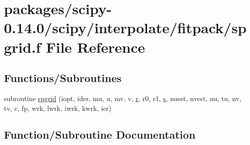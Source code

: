 \hypertarget{spgrid_8f}{}\section{packages/scipy-\/0.14.0/scipy/interpolate/fitpack/spgrid.f File Reference}
\label{spgrid_8f}
\subsection*{Functions/\+Subroutines}
\begin{DoxyCompactItemize}
\item 
subroutine \hyperlink{spgrid_8f_a37910db0eb468bcfce8bea8339d3eaea}{spgrid} (iopt, ider, mu, u, mv, v, \hyperlink{indexexpr_8h_ac434fd11cc2493608d8d91424d60c17e}{r}, r0, r1, \hyperlink{indexexpr_8h_ae024b0db549122b44c349ae28ec990dc}{s}, nuest, nvest, nu, tu, nv, tv, c, fp, wrk, lwrk, iwrk, kwrk, ier)
\end{DoxyCompactItemize}


\subsection{Function/\+Subroutine Documentation}
\hypertarget{spgrid_8f_a37910db0eb468bcfce8bea8339d3eaea}{}
